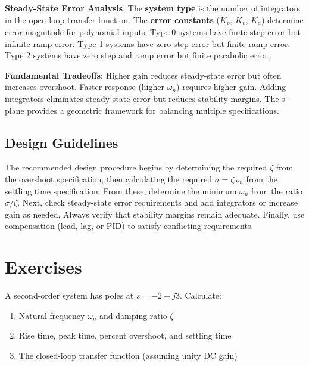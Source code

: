 \textbf{Steady-State Error Analysis}: The \textbf{system type} is the number of integrators in the open-loop transfer function. The \textbf{error constants} ($K_p$, $K_v$, $K_a$) determine error magnitude for polynomial inputs. Type 0 systems have finite step error but infinite ramp error. Type 1 systems have zero step error but finite ramp error. Type 2 systems have zero step and ramp error but finite parabolic error.

\textbf{Fundamental Tradeoffs}: Higher gain reduces steady-state error but often increases overshoot. Faster response (higher $\omega_n$) requires higher gain. Adding integrators eliminates steady-state error but reduces stability margins. The s-plane provides a geometric framework for balancing multiple specifications.

\subsection*{Design Guidelines}

The recommended design procedure begins by determining the required $\zeta$ from the overshoot specification, then calculating the required $\sigma = \zeta\omega_n$ from the settling time specification. From these, determine the minimum $\omega_n$ from the ratio $\sigma/\zeta$. Next, check steady-state error requirements and add integrators or increase gain as needed. Always verify that stability margins remain adequate. Finally, use compensation (lead, lag, or PID) to satisfy conflicting requirements.

\newpage
\section{Exercises}

\begin{exercise}
A second-order system has poles at $s = -2 \pm j3$. Calculate:
\begin{enumerate}
    \item Natural frequency $\omega_n$ and damping ratio $\zeta$
    \item Rise time, peak time, percent overshoot, and settling time
    \item The closed-loop transfer function (assuming unity DC gain)
\end{enumerate}
\end{exercise}


